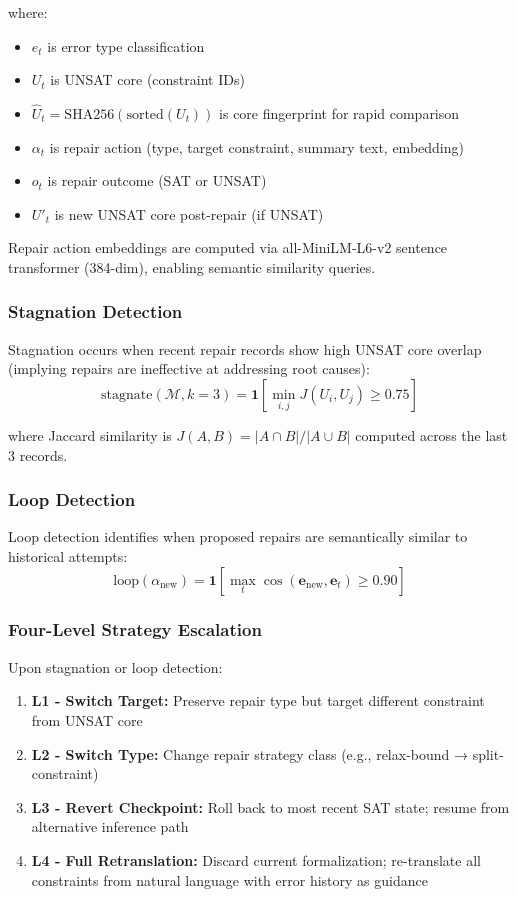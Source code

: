 \documentclass[letterpaper]{article}
\begin{document}
where:
\begin{itemize}
    \item $e_t$ is error type classification
    \item $U_t$ is UNSAT core (constraint IDs)
    \item $\hat{U}_t = \text{SHA256}(\text{sorted}(U_t))$ is core fingerprint for rapid comparison
    \item $\alpha_t$ is repair action (type, target constraint, summary text, embedding)
    \item $o_t$ is repair outcome (SAT or UNSAT)
    \item $U'_t$ is new UNSAT core post-repair (if UNSAT)
\end{itemize}

Repair action embeddings are computed via all-MiniLM-L6-v2 sentence transformer (384-dim), enabling semantic similarity queries.

\subsubsection{Stagnation Detection}

Stagnation occurs when recent repair records show high UNSAT core overlap (implying repairs are ineffective at addressing root causes):
$$\text{stagnate}(\mathcal{M}, k=3) = \mathbf{1}[\min_{i,j} J(U_i, U_j) \geq 0.75]$$

where Jaccard similarity is $J(A,B) = |A \cap B| / |A \cup B|$ computed across the last 3 records.

\subsubsection{Loop Detection}

Loop detection identifies when proposed repairs are semantically similar to historical attempts:
$$\text{loop}(\alpha_{\text{new}}) = \mathbf{1}[\max_t \cos(\mathbf{e}_{\text{new}}, \mathbf{e}_t) \geq 0.90]$$

\subsubsection{Four-Level Strategy Escalation}

Upon stagnation or loop detection:
\begin{enumerate}
    \item \textbf{L1 - Switch Target:} Preserve repair type but target different constraint from UNSAT core
    \item \textbf{L2 - Switch Type:} Change repair strategy class (e.g., relax-bound → split-constraint)
    \item \textbf{L3 - Revert Checkpoint:} Roll back to most recent SAT state; resume from alternative inference path
    \item \textbf{L4 - Full Retranslation:} Discard current formalization; re-translate all constraints from natural language with error history as guidance
\end{enumerate}
\end{document}
